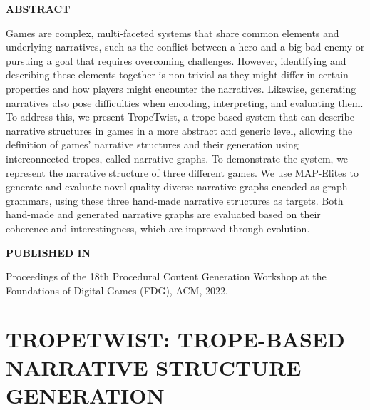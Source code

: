 \graphicspath{{included-papers-tex/paper-12/}}



\normalfont
\textbf{\textsc{ABSTRACT}}

Games are complex, multi-faceted systems that share common elements and underlying narratives, such as the conflict between a hero and a big bad enemy or pursuing a goal that requires overcoming challenges. However, identifying and describing these elements together is non-trivial as they might differ in certain properties and how players might encounter the narratives. Likewise, generating narratives also pose difficulties when encoding, interpreting, and evaluating them. To address this, we present TropeTwist, a trope-based system that can describe narrative structures in games in a more abstract and generic level, allowing the definition of games' narrative structures and their generation using interconnected tropes, called narrative graphs. To demonstrate the system, we represent the narrative structure of three different games. We use MAP-Elites to generate and evaluate novel quality-diverse narrative graphs encoded as graph grammars, using these three hand-made narrative structures as targets. Both hand-made and generated narrative graphs are evaluated based on their coherence and interestingness, which are improved through evolution.

\textbf{\textsc{PUBLISHED IN}}

Proceedings of the 18th Procedural Content Generation Workshop at the Foundations of Digital Games (FDG), ACM, 2022.

\section*{TROPETWIST: TROPE-BASED NARRATIVE STRUCTURE GENERATION}




% 

% 



